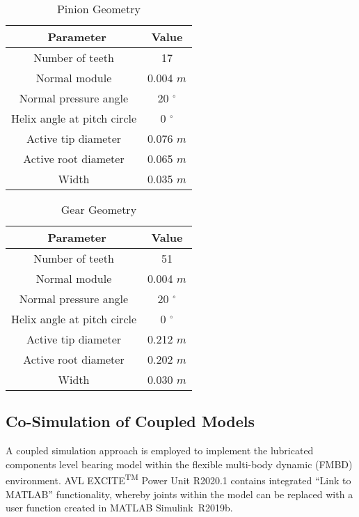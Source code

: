 \begin{table*}
	\caption{Pinion Geometry}
	\label{Pinion Geometry}
	\centering
	\renewcommand{\arraystretch}{1.5}%
	\begin{tabular}{|c|c|}
		\hline
		\ \textbf{Parameter} & \textbf{Value} \\ [0.5ex]
		\hline
		Number of teeth & 17 \\ [0.5ex]
		\hline
		Normal module & 0.004 $m$ \\ [0.5ex]
		\hline
		Normal pressure angle & 20 $^{\circ}$ \\ [0.5ex]
		\hline
		Helix angle at pitch circle & 0 $^{\circ}$ \\ [0.5ex]
		\hline
		Active tip diameter & 0.076 $m$ \\ [0.5ex]
		\hline
		Active root diameter & 0.065 $m$ \\ [0.5ex]
		\hline
		Width & 0.035 $m$ \\ [0.5ex]
		\hline
	\end{tabular}
\end{table*}

\begin{table*}
	\caption{Gear Geometry}
	\label{Gear Geometry}
	\centering
	\renewcommand{\arraystretch}{1.5}%
	\begin{tabular}{|c|c|}
		\hline
		\ \textbf{Parameter} & \textbf{Value} \\ [0.5ex]
		\hline
		Number of teeth & 51 \\ [0.5ex]
		\hline
		Normal module & 0.004 $m$ \\ [0.5ex]
		\hline
		Normal pressure angle & 20 $^{\circ}$ \\ [0.5ex]
		\hline
		Helix angle at pitch circle & 0 $^{\circ}$ \\ [0.5ex]
		\hline
		Active tip diameter & 0.212 $m$ \\ [0.5ex]
		\hline
		Active root diameter & 0.202 $m$ \\ [0.5ex]
		\hline
		Width & 0.030 $m$ \\ [0.5ex]
		\hline
	\end{tabular}
\end{table*}

\subsection{Co-Simulation of Coupled Models}
A coupled simulation approach is employed to implement the lubricated components level bearing model within the flexible multi-body dynamic (FMBD) environment. AVL EXCITE\textsuperscript{TM} Power Unit R2020.1 contains integrated “Link to MATLAB” functionality, whereby joints within the model can be replaced with a user function created in MATLAB Simulink\textregistered\ R2019b.


